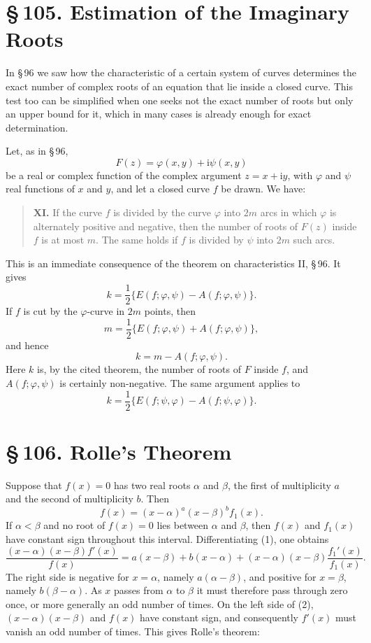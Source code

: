 \documentclass[11pt]{article}
\providecommand{\ii}{\mathrm{i}}
\providecommand{\sect}[2]{\section*{\S\,#1. #2}}
\begin{document}
\sect{105}{Estimation of the Imaginary Roots}

In \S\,96 we saw how the characteristic of a certain system of curves determines the exact number of complex roots of an equation that lie inside a closed curve. This test too can be simplified when one seeks not the exact number of roots but only an upper bound for it, which in many cases is already enough for exact determination.

Let, as in \S\,96,
\begin{equation}
        F(z)=\varphi(x,y)+\ii\psi(x,y)
\tag{1}
\end{equation}
be a real or complex function of the complex argument $z=x+\ii y$, with $\varphi$ and $\psi$ real functions of $x$ and $y$, and let a closed curve $f$ be drawn. We have:

\begin{quote}
\textbf{XI.} If the curve $f$ is divided by the curve $\varphi$ into $2m$ arcs in which $\varphi$ is alternately positive and negative, then the number of roots of $F(z)$ inside $f$ is at most $m$. The same holds if $f$ is divided by $\psi$ into $2m$ such arcs.
\end{quote}

This is an immediate consequence of the theorem on characteristics II, \S\,96. It gives
\[
        k=\frac12\{E(f;\varphi,\psi)-A(f;\varphi,\psi)\}.
\]
If $f$ is cut by the $\varphi$-curve in $2m$ points, then
\[
        m=\frac12\{E(f;\varphi,\psi)+A(f;\varphi,\psi)\},
\]
and hence
\[
        k=m-A(f;\varphi,\psi).
\]
Here $k$ is, by the cited theorem, the number of roots of $F$ inside $f$, and $A(f;\varphi,\psi)$ is certainly non-negative. The same argument applies to
\[
        k=\frac12\{E(f;\psi,\varphi)-A(f;\psi,\varphi)\}.
\]

\sect{106}{Rolle's Theorem}

Suppose that $f(x)=0$ has two real roots $\alpha$ and $\beta$, the first of multiplicity $a$ and the second of multiplicity $b$. Then
\begin{equation}
        f(x)=(x-\alpha)^a(x-\beta)^b f_1(x).
\tag{1}
\end{equation}
If $\alpha<\beta$ and no root of $f(x)=0$ lies between $\alpha$ and $\beta$, then $f(x)$ and $f_1(x)$ have constant sign throughout this interval. Differentiating (1), one obtains
\begin{equation}
\frac{(x-\alpha)(x-\beta)f'(x)}{f(x)}
=a(x-\beta)+b(x-\alpha)+(x-\alpha)(x-\beta)\frac{f_1'(x)}{f_1(x)}.
\tag{2}
\end{equation}
The right side is negative for $x=\alpha$, namely $a(\alpha-\beta)$, and positive for $x=\beta$, namely $b(\beta-\alpha)$. As $x$ passes from $\alpha$ to $\beta$ it must therefore pass through zero once, or more generally an odd number of times. On the left side of (2), $(x-\alpha)(x-\beta)$ and $f(x)$ have constant sign, and consequently $f'(x)$ must vanish an odd number of times. This gives Rolle's theorem:
\end{document}
